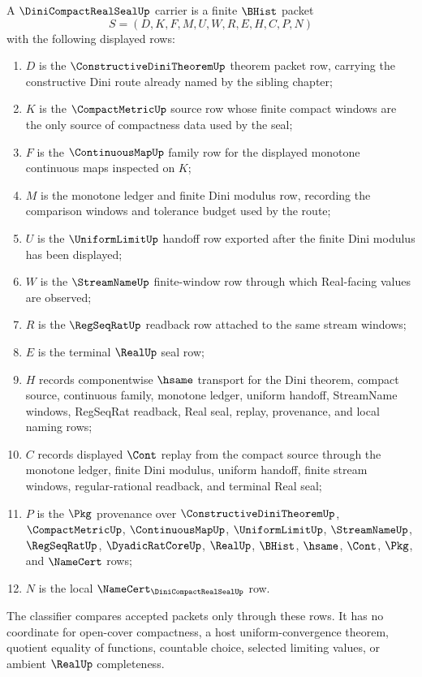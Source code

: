 \begin{definition}
\label{def:dini-compact-real-seal-carrier}
A $\DiniCompactRealSealUp$ carrier is a finite $\BHist$ packet
$$
S=(D,K,F,M,U,W,R,E,H,C,P,N)
$$
with the following displayed rows:
\begin{enumerate}
\item $D$ is the $\ConstructiveDiniTheoremUp$ theorem packet row, carrying the constructive Dini route already named by the sibling chapter;
\item $K$ is the $\CompactMetricUp$ source row whose finite compact windows are the only source of compactness data used by the seal;
\item $F$ is the $\ContinuousMapUp$ family row for the displayed monotone continuous maps inspected on $K$;
\item $M$ is the monotone ledger and finite Dini modulus row, recording the comparison windows and tolerance budget used by the route;
\item $U$ is the $\UniformLimitUp$ handoff row exported after the finite Dini modulus has been displayed;
\item $W$ is the $\StreamNameUp$ finite-window row through which Real-facing values are observed;
\item $R$ is the $\RegSeqRatUp$ readback row attached to the same stream windows;
\item $E$ is the terminal $\RealUp$ seal row;
\item $H$ records componentwise $\hsame$ transport for the Dini theorem, compact source, continuous family, monotone ledger, uniform handoff, StreamName windows, RegSeqRat readback, Real seal, replay, provenance, and local naming rows;
\item $C$ records displayed $\Cont$ replay from the compact source through the monotone ledger, finite Dini modulus, uniform handoff, finite stream windows, regular-rational readback, and terminal Real seal;
\item $P$ is the $\Pkg$ provenance over $\ConstructiveDiniTheoremUp$, $\CompactMetricUp$, $\ContinuousMapUp$, $\UniformLimitUp$, $\StreamNameUp$, $\RegSeqRatUp$, $\DyadicRatCoreUp$, $\RealUp$, $\BHist$, $\hsame$, $\Cont$, $\Pkg$, and $\NameCert$ rows;
\item $N$ is the local $\NameCert_{\DiniCompactRealSealUp}$ row.
\end{enumerate}
The classifier compares accepted packets only through these rows. It has no coordinate for open-cover compactness, a host uniform-convergence theorem, quotient equality of functions, countable choice, selected limiting values, or ambient $\RealUp$ completeness.
\end{definition}

